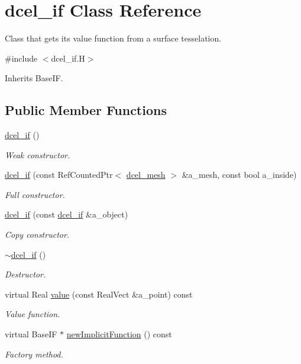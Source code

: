 \hypertarget{classdcel__if}{}\section{dcel\+\_\+if Class Reference}
\label{classdcel__if}


Class that gets it\textquotesingle{}s value function from a surface tesselation.  




{\ttfamily \#include $<$dcel\+\_\+if.\+H$>$}



Inherits Base\+IF.

\subsection*{Public Member Functions}
\begin{DoxyCompactItemize}
\item 
\hyperlink{classdcel__if_ac3e2e1dd6cd124df481f821267647456}{dcel\+\_\+if} ()
\begin{DoxyCompactList}\small\item\em Weak constructor. \end{DoxyCompactList}\item 
\hyperlink{classdcel__if_ab54a2cc3a09cf45a4f8432b8ef712d61}{dcel\+\_\+if} (const Ref\+Counted\+Ptr$<$ \hyperlink{classdcel__mesh}{dcel\+\_\+mesh} $>$ \&a\+\_\+mesh, const bool a\+\_\+inside)
\begin{DoxyCompactList}\small\item\em Full constructor. \end{DoxyCompactList}\item 
\hyperlink{classdcel__if_a18b5456fbf18b07503bbb523b767334f}{dcel\+\_\+if} (const \hyperlink{classdcel__if}{dcel\+\_\+if} \&a\+\_\+object)
\begin{DoxyCompactList}\small\item\em Copy constructor. \end{DoxyCompactList}\item 
\hyperlink{classdcel__if_ae4750b7a976a159f6978cc656a88448c}{$\sim$dcel\+\_\+if} ()
\begin{DoxyCompactList}\small\item\em Destructor. \end{DoxyCompactList}\item 
virtual Real \hyperlink{classdcel__if_adb5e9fa95d81518e0556d9d651858a7a}{value} (const Real\+Vect \&a\+\_\+point) const 
\begin{DoxyCompactList}\small\item\em Value function. \end{DoxyCompactList}\item 
virtual Base\+IF $\ast$ \hyperlink{classdcel__if_a4c94cfc7b5df75ebe557ebe62c7d6aad}{new\+Implicit\+Function} () const 
\begin{DoxyCompactList}\small\item\em Factory method. \end{DoxyCompactList}\end{DoxyCompactItemize}
